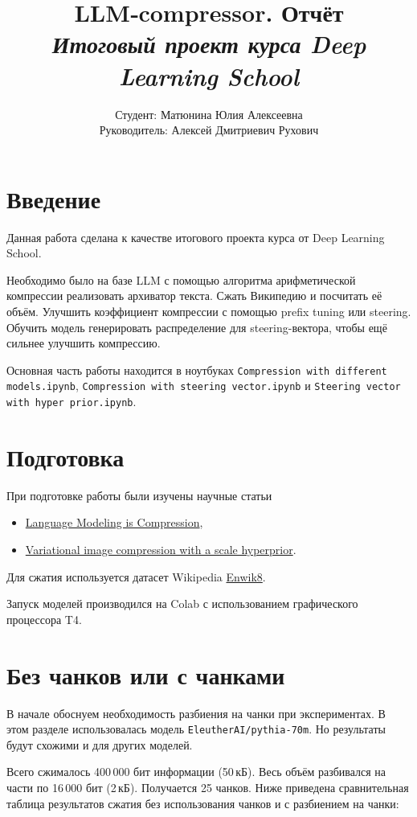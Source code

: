 \documentclass[a4paper,11pt]{article}
\title{%
  LLM‑compressor. Отчёт\\[0.5ex]
  {\large\itshape Итоговый проект курса Deep Learning School}%
}
\author{%
  Студент: Матюнина Юлия Алексеевна\\
  Руководитель: Алексей Дмитриевич Рухович%
}
\date{}
\begin{document}
\maketitle

\section*{Введение}

Данная работа сделана к качестве итогового проекта курса от Deep Learning School.

Необходимо было на базе LLM с помощью алгоритма арифметической компрессии реализовать архиватор текста. Сжать Википедию и посчитать её объём. Улучшить коэффициент компрессии с помощью prefix tuning или steering. Обучить модель генерировать распределение для steering-вектора, чтобы ещё сильнее улучшить компрессию.

Основная часть работы находится в ноутбуках \texttt{Compression with different models.ipynb}, \texttt{Compression with steering vector.ipynb} и \texttt{Steering vector with hyper prior.ipynb}.

\section*{Подготовка}

При подготовке работы были изучены научные статьи
\begin{itemize}
  \item \href{https://arxiv.org/pdf/2309.10668}{Language Modeling is Compression},
  \item \href{https://arxiv.org/pdf/1802.01436}{Variational image compression with a scale hyperprior}.
\end{itemize}
Для сжатия используется датасет Wikipedia
\href{https://www.kaggle.com/datasets/nightfury1103/enwik8}{Enwik8}.

Запуск моделей производился на Colab с использованием графического процессора T4.

\section*{Без чанков или с чанками}

В начале обоснуем необходимость разбиения на чанки при экспериментах. В этом разделе использовалась модель \texttt{EleutherAI/pythia-70m}. Но результаты будут схожими и для других моделей.

Всего сжималось 400\,000 бит информации (50\,кБ). Весь объём разбивался на части по 16\,000 бит (2\,кБ). Получается 25 чанков.
Ниже приведена сравнительная таблица результатов сжатия без использования чанков и с разбиением на чанки:
\end{document}
